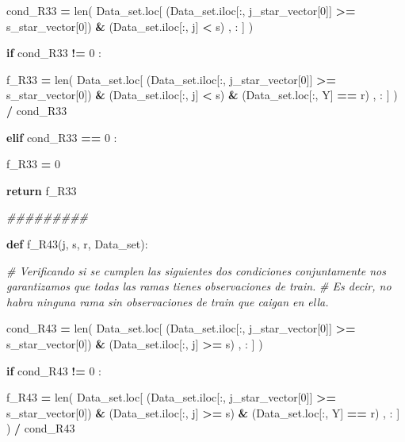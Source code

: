 \documentclass[
  11pt,
  a4paper,
]{article}
\newenvironment{Shaded}{\begin{snugshade}}{\end{snugshade}}
\newcommand{\BuiltInTok}[1]{#1}
\newcommand{\CommentTok}[1]{\textcolor[rgb]{0.56,0.35,0.01}{\textit{#1}}}
\newcommand{\ControlFlowTok}[1]{\textcolor[rgb]{0.13,0.29,0.53}{\textbf{#1}}}
\newcommand{\DecValTok}[1]{\textcolor[rgb]{0.00,0.00,0.81}{#1}}
\newcommand{\KeywordTok}[1]{\textcolor[rgb]{0.13,0.29,0.53}{\textbf{#1}}}
\newcommand{\NormalTok}[1]{#1}
\newcommand{\OperatorTok}[1]{\textcolor[rgb]{0.81,0.36,0.00}{\textbf{#1}}}
\newcommand{\StringTok}[1]{\textcolor[rgb]{0.31,0.60,0.02}{#1}}
\begin{document}
\begin{Shaded}
\begin{Highlighting}[]
\NormalTok{            cond\_R33 }\OperatorTok{=} \BuiltInTok{len}\NormalTok{( Data\_set.loc[ (Data\_set.iloc[:, j\_star\_vector[}\DecValTok{0}\NormalTok{]] }\OperatorTok{\textgreater{}=}\NormalTok{ s\_star\_vector[}\DecValTok{0}\NormalTok{]) }\OperatorTok{\&}\NormalTok{ (Data\_set.iloc[:, j] }\OperatorTok{\textless{}}\NormalTok{ s) , : ] ) }

            \ControlFlowTok{if}\NormalTok{  cond\_R33 }\OperatorTok{!=} \DecValTok{0}\NormalTok{ :}

\NormalTok{                f\_R33 }\OperatorTok{=} \BuiltInTok{len}\NormalTok{( Data\_set.loc[ (Data\_set.iloc[:, j\_star\_vector[}\DecValTok{0}\NormalTok{]] }\OperatorTok{\textgreater{}=}\NormalTok{ s\_star\_vector[}\DecValTok{0}\NormalTok{]) }\OperatorTok{\&}\NormalTok{ (Data\_set.iloc[:, j] }\OperatorTok{\textless{}}\NormalTok{ s) }\OperatorTok{\&}\NormalTok{ (Data\_set.loc[:, }\StringTok{\textquotesingle{}Y\textquotesingle{}}\NormalTok{] }\OperatorTok{==}\NormalTok{ r) , : ] ) }\OperatorTok{/}\NormalTok{ cond\_R33}

            
            \ControlFlowTok{elif}\NormalTok{ cond\_R33 }\OperatorTok{==} \DecValTok{0}\NormalTok{ :}

\NormalTok{                f\_R33 }\OperatorTok{=} \DecValTok{0}
            
            \ControlFlowTok{return}\NormalTok{ f\_R33}

        \CommentTok{\#\#\#\#\#\#\#\#\#}

        \KeywordTok{def}\NormalTok{ f\_R43(j, s, r, Data\_set):}

           \CommentTok{\# Verificando si se cumplen las siguientes dos condiciones conjuntamente nos garantizamos que todas las ramas tienes observaciones de train. }
           \CommentTok{\# Es decir, no habra ninguna rama sin observaciones de train que caigan en ella.}

\NormalTok{            cond\_R43 }\OperatorTok{=} \BuiltInTok{len}\NormalTok{( Data\_set.loc[ (Data\_set.iloc[:, j\_star\_vector[}\DecValTok{0}\NormalTok{]] }\OperatorTok{\textgreater{}=}\NormalTok{ s\_star\_vector[}\DecValTok{0}\NormalTok{]) }\OperatorTok{\&}\NormalTok{ (Data\_set.iloc[:, j] }\OperatorTok{\textgreater{}=}\NormalTok{ s) , : ] ) }

            \ControlFlowTok{if}\NormalTok{  cond\_R43 }\OperatorTok{!=} \DecValTok{0}\NormalTok{ :}

\NormalTok{                f\_R43 }\OperatorTok{=} \BuiltInTok{len}\NormalTok{( Data\_set.loc[ (Data\_set.iloc[:, j\_star\_vector[}\DecValTok{0}\NormalTok{]] }\OperatorTok{\textgreater{}=}\NormalTok{ s\_star\_vector[}\DecValTok{0}\NormalTok{]) }\OperatorTok{\&}\NormalTok{ (Data\_set.iloc[:, j] }\OperatorTok{\textgreater{}=}\NormalTok{ s) }\OperatorTok{\&}\NormalTok{ (Data\_set.loc[:, }\StringTok{\textquotesingle{}Y\textquotesingle{}}\NormalTok{] }\OperatorTok{==}\NormalTok{ r) , : ] ) }\OperatorTok{/}\NormalTok{ cond\_R43}


\end{Highlighting}
\end{Shaded}
\end{document}
